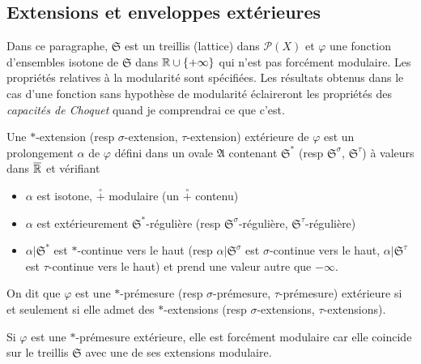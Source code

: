 \subsection{Extensions et enveloppes extérieures} \label{SubSec:EnvlpExterieures}
Dans ce paragraphe, $\mathfrak{S}$ est un treillis (lattice) dans $\mathcal{P}(X)$ et $\varphi$ une fonction d'ensembles isotone de $\mathfrak{S}$ dans $\mathbb{R} \cup \left\lbrace +\infty \right\rbrace$ qui n'est pas forcément modulaire. Les propriétés relatives à la modularité sont spécifiées. Les résultats obtenus dans le cas d'une fonction sans hypothèse de modularité éclaireront les propriétés des \emph{capacités de Choquet} quand je comprendrai ce que c'est.
\begin{defi}
 Une $*$-extension (resp $\sigma$-extension, $\tau$-extension) extérieure de $\varphi$ est un prolongement $\alpha$ de $\varphi$ défini dans un ovale $\mathfrak{A}$ contenant $\mathfrak{S}^*$  (resp $\mathfrak{S}^\sigma$, $\mathfrak{S}^\tau$) à valeurs dans $\overline{\mathbb{R}}$ et vérifiant
 \begin{itemize}
  \item $\alpha$ est isotone, $\overset{\circ}{+}$ modulaire (un $\overset{\circ}{+}$ contenu)
  \item $\alpha$ est extérieurement $\mathfrak{S}^*$-régulière (resp $\mathfrak{S}^\sigma$-régulière, $\mathfrak{S}^\tau$-régulière)
  \item $\alpha|\mathfrak{S}^*$ est $*$-continue vers le haut (resp $\alpha|\mathfrak{S}^\sigma$ est $\sigma$-continue vers le haut, $\alpha|\mathfrak{S}^\tau$ est $\tau$-continue vers le haut) et prend une valeur autre que $-\infty$.
 \end{itemize}
\end{defi}
\begin{defi}
 On dit que $\varphi$ est une $*$-prémesure (resp $\sigma$-prémesure, $\tau$-prémesure) extérieure si et seulement si elle admet des $*$-extensions (resp $\sigma$-extensions, $\tau$-extensions).
\end{defi}

\begin{rem}
  Si $\varphi$ est une $*$-prémesure extérieure, elle est forcément modulaire car elle coincide sur le treillis $\mathfrak{S}$ avec une de ses extensions modulaire.
\end{rem}

